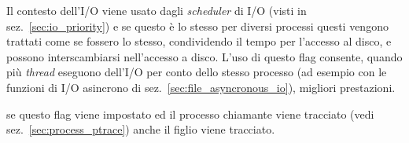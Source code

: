 \begin{basedescript}{\desclabelwidth{1.5 cm}\desclabelstyle{\nextlinelabel}}
  Il contesto dell'I/O viene usato dagli \textit{scheduler} di I/O (visti in
  sez.~\ref{sec:io_priority}) e se questo è lo stesso per diversi processi
  questi vengono trattati come se fossero lo stesso, condividendo il tempo per
  l'accesso al disco, e possono interscambiarsi nell'accesso a disco. L'uso di
  questo flag consente, quando più \textit{thread} eseguono dell'I/O per conto
  dello stesso processo (ad esempio con le funzioni di I/O asincrono di
  sez.~\ref{sec:file_asyncronous_io}), migliori prestazioni.







\item[\constd{CLONE\_PARENT}]
\item[\constd{CLONE\_PARENT\_SETTID}]
\item[\constd{CLONE\_PID}]

  
\item[\constd{CLONE\_PTRACE}] se questo flag viene impostato ed il processo
  chiamante viene tracciato (vedi sez.~\ref{sec:process_ptrace}) anche il
  figlio viene tracciato. 


\end{basedescript}
